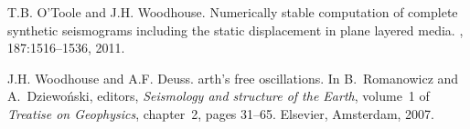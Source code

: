 \documentclass[a4paper,11pt]{article}
\begin{document}

\begin{thebibliography}{1}

T.B. O'Toole and J.H. Woodhouse.
\newblock Numerically stable computation of complete synthetic seismograms
  including the static displacement in plane layered media.
, 187:1516--1536, 2011.

J.H. Woodhouse and A.F. Deuss.
arth's free oscillations.
\newblock In B.~Romanowicz and A.~Dziewo\'{n}ski, editors, {\em Seismology and
  structure of the {E}arth}, volume~1 of {\em Treatise on Geophysics},
  chapter~2, pages 31--65. Elsevier, Amsterdam, 2007.

\end{thebibliography}
\end{document}
